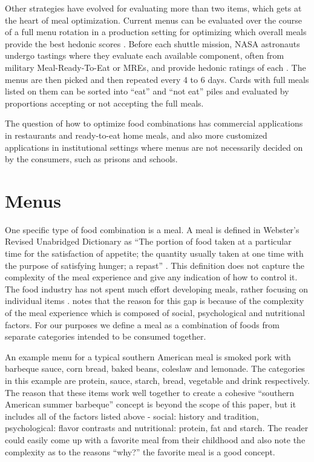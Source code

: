 Other strategies have evolved for evaluating more than two items, which gets at the heart of meal optimization.  Current menus can be evaluated over the course of a full menu rotation in a production setting for optimizing which overall meals provide the best hedonic scores \citep{Pagliarini2005}. Before each shuttle mission, NASA astronauts undergo tastings where they evaluate each available component, often from military Meal-Ready-To-Eat or MREs\tm, and provide hedonic ratings of each \citep{Kerwin2002}.  The menus are then picked and then repeated every 4 to 6 days.  Cards with full meals listed on them can be sorted into “eat” and “not eat” piles \citep{Jonsson1991} and evaluated by proportions accepting or not accepting the full meals.

The question of how to optimize food combinations has commercial applications in restaurants and ready-to-eat home meals, and also more customized applications in institutional settings where menus are not necessarily decided on by the consumers, such as prisons and schools.

\section{Menus}
One specific type of food combination is a meal.  A meal is defined in Webster’s Revised Unabridged Dictionary as “The portion of food taken at a particular time for the satisfaction of appetite; the quantity usually taken at one time with the purpose of satisfying hunger; a repast” \citep{Webster1913}.  This definition does not capture the complexity of the meal experience and give any indication of how to control it.  The food industry has not spent much effort developing meals, rather focusing on individual items \citep{Meiselman2000}.  \citet{Meiselman2000} notes that the reason for this gap is because of the complexity of the meal experience which is composed of social, psychological \citep[see][chap. 2]{Lawless2010} and nutritional factors.  For our purposes we define a meal as a combination of foods from separate categories intended to be consumed together. 
 
An example menu for a typical southern American meal is smoked pork with barbeque sauce, corn bread, baked beans, coleslaw and lemonade.  The categories in this example are protein, sauce, starch, bread, vegetable and drink respectively.  The reason that these items work well together to create a cohesive “southern American summer barbeque” concept is beyond the scope of this paper, but it includes all of the factors listed above -  social: history and tradition, psychological: flavor contrasts \citep{Lawless1977,Lawless1979,Lawless1987,Lawless2010,Lawless2000} and nutritional: protein, fat and starch.  The reader could easily come up with a favorite meal from their childhood and also note the complexity as to the reasons “why?” the favorite meal is a good concept.  
 

